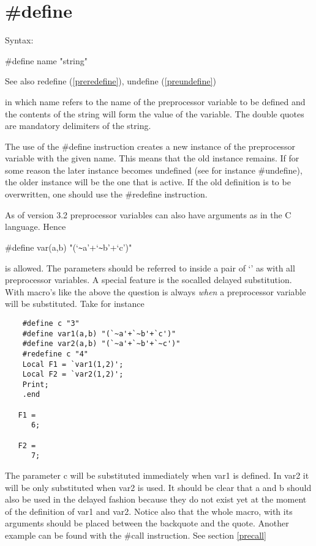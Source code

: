 
\section{\#define}
\label{predefine}

\noindent Syntax:

\#define name "string"
 
\noindent See also redefine (\ref{preredefine}), undefine 
(\ref{preundefine})

\noindent in which name refers to the name of the 
preprocessor 
variable to be defined and the contents of the 
string will form the value of the variable. The double quotes are mandatory 
delimiters of the string.

The use of the \#define instruction creates a new instance 
of the preprocessor variable with the given name. This means that the old 
instance remains. If for some reason the later instance 
becomes undefined (see for instance \#undefine), the older instance will be 
the one that is active. If the old definition is to be overwritten, one 
should use the \#redefine instruction.

As of version 3.2 preprocessor variables can also have arguments as in the 
C language. Hence

\#define var(a,b) "(`\verb:~:a'+`\verb:~:b'+`c')"

is allowed. The parameters should be referred to inside a pair of `' as 
with all preprocessor variables. A special feature is the socalled 
delayed 
substitution. With macro's like the above the 
question is always {\sl when} a preprocessor variable will be substituted. 
Take for instance
\begin{verbatim}
    #define c "3"
    #define var1(a,b) "(`~a'+`~b'+`c')"
    #define var2(a,b) "(`~a'+`~b'+`~c')"
    #redefine c "4"
    Local F1 = `var1(1,2)';
    Local F2 = `var2(1,2)';
    Print;
    .end

   F1 =
      6;

   F2 =
      7;
\end{verbatim}
The parameter c will be substituted immediately when var1 is defined. In 
var2 it will be only substituted when var2 is used. It should be clear that 
a and b should also be used in the delayed fashion because they do not 
exist yet at the moment of the definition of var1 and var2. Notice also 
that the whole macro, with its arguments should be placed 
between the backquote and the quote. Another example can be found with the 
\#call instruction. See section \ref{precall}

